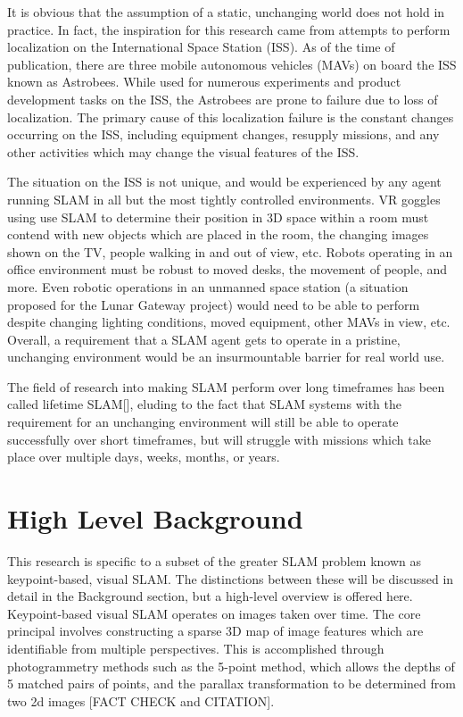 \documentclass[12pt]{article}
\begin{document}
It is obvious that the assumption of a static, unchanging world does not hold in practice. In fact, the inspiration for this research came from attempts to perform localization on the International Space Station (ISS). As of the time of publication, there are three mobile autonomous vehicles (MAVs) on board the ISS known as Astrobees. While used for numerous experiments and product development tasks on the ISS, the Astrobees are prone to failure due to loss of localization. The primary cause of this localization failure is the constant changes occurring on the ISS, including equipment changes, resupply missions, and any other activities which may change the visual features of the ISS.

The situation on the ISS is not unique, and would be experienced by any agent running SLAM in all but the most tightly controlled environments. VR goggles using use SLAM to determine their position in 3D space within a room must contend with new objects which are placed in the room, the changing images shown on the TV, people walking in and out of view, etc. Robots operating in an office environment must be robust to moved desks, the movement of people, and more. Even robotic operations in an unmanned space station (a situation proposed for the Lunar Gateway project) would need to be able to perform despite changing lighting conditions, moved equipment, other MAVs in view, etc. Overall, a requirement that a SLAM agent gets to operate in a pristine, unchanging environment would be an insurmountable barrier for real world use.

The field of research into making SLAM perform over long timeframes has been called lifetime SLAM[], eluding to the fact that SLAM systems with the requirement for an unchanging environment will still be able to operate successfully over short timeframes, but will struggle with missions which take place over multiple days, weeks, months, or years.

\section{High Level Background}

This research is specific to a subset of the greater SLAM problem known as keypoint-based, visual SLAM. The distinctions between these will be discussed in detail in the Background section, but a high-level overview is offered here. Keypoint-based visual SLAM operates on images taken over time. The core principal involves constructing a sparse 3D map of image features which are identifiable from multiple perspectives. This is accomplished through photogrammetry methods such as the 5-point method, which allows the depths of 5 matched pairs of points, and the parallax transformation to be determined from two 2d images [FACT CHECK and CITATION].
\end{document}

